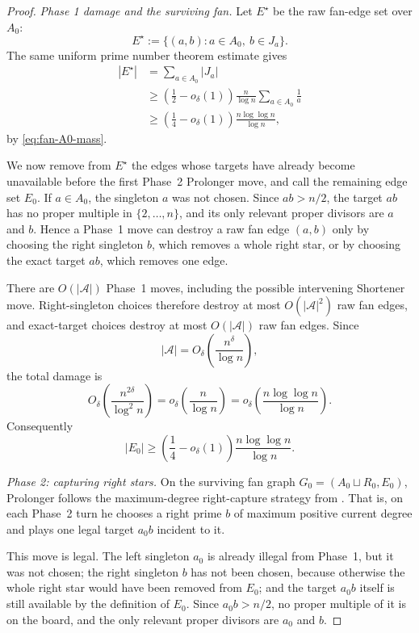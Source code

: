 \begin{proof}
\smallskip
\noindent\emph{Phase 1 damage and the surviving fan.}
Let $E^\star$ be the raw fan-edge set over $A_0$:
\[
  E^\star:=\{(a,b):a\in A_0,\ b\in J_a\}.
\]
The same uniform prime number theorem estimate gives
\[
\begin{aligned}
  |E^\star|
  &=
  \sum_{a\in A_0}|J_a|\\
  &\ge
  \left(\frac12-o_\delta(1)\right)
  \frac n{\log n}
  \sum_{a\in A_0}\frac1a\\
  &\ge
  \left(\frac14-o_\delta(1)\right)
  \frac{n\log\log n}{\log n},
\end{aligned}
  \tag{4.6}\label{eq:raw-fan-count}
\]
by \eqref{eq:fan-A0-mass}.

We now remove from $E^\star$ the edges whose targets have already become
unavailable before the first Phase~2 Prolonger move, and call the remaining
edge set $E_0$.  If $a\in A_0$, the singleton $a$ was not chosen.  Since
$ab>n/2$, the target $ab$ has no proper multiple in $\{2,\ldots,n\}$, and its
only relevant proper divisors are $a$ and $b$.  Hence a Phase~1 move can
destroy a raw fan edge $(a,b)$ only by choosing the right singleton $b$, which
removes a whole right star, or by choosing the exact target $ab$, which removes
one edge.

There are $O(|\mathcal A|)$ Phase~1 moves, including the possible intervening
Shortener move.  Right-singleton choices therefore destroy at most
$O(|\mathcal A|^2)$ raw fan edges, and exact-target choices destroy at most
$O(|\mathcal A|)$ raw fan edges.  Since
\[
  |\mathcal A|=O_\delta\!\left(\frac{n^\delta}{\log n}\right),
\]
the total damage is
\[
  O_\delta\!\left(\frac{n^{2\delta}}{\log^2 n}\right)
  =
  o_\delta\!\left(\frac n{\log n}\right)
  =
  o_\delta\!\left(\frac{n\log\log n}{\log n}\right).
\]
Consequently
\[
  |E_0|
  \ge
  \left(\frac14-o_\delta(1)\right)
  \frac{n\log\log n}{\log n}.
  \tag{4.7}\label{eq:surviving-fan-count}
\]

\smallskip
\noindent\emph{Phase 2: capturing right stars.}
On the surviving fan graph $G_0=(A_0\sqcup R_0,E_0)$, Prolonger follows the
maximum-degree right-capture strategy from .  That
is, on each Phase~2 turn he chooses a right prime $b$ of maximum positive
current degree and plays one legal target $a_0b$ incident to it.

This move is legal.  The left singleton $a_0$ is already illegal from Phase~1,
but it was not chosen; the right singleton $b$ has not been chosen, because
otherwise the whole right star would have been removed from $E_0$; and the
target $a_0b$ itself is still available by the definition of $E_0$.  Since
$a_0b>n/2$, no proper multiple of it is on the board, and the only relevant
proper divisors are $a_0$ and $b$.


\end{proof}
